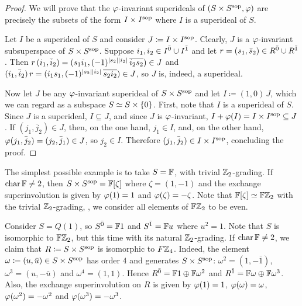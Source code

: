 \begin{proof}
    We will prove that the $\varphi$-invariant superideals of $(S \times S^{\mathrm{sop}}, \varphi)$ are precisely the subsets of the form $I \times I^{\mathrm{sop}}$ where $I$ is a superideal of $S$. 
    
    Let $I$ be a superideal of $S$ and consider $J \coloneqq I \times I^{\mathrm{sop}}$. 
    Clearly, $J$ is a $\varphi$-invariant subsuperspace of $S \times S^{\mathrm{sop}}$. 
    Suppose $i_1, i_2 \in I^{\bar0} \cup I^{\bar1}$ and let $r = (s_1, \bar s_2) \in R^{\bar0} \cup R^{\bar1}$. 
    Then $r\, (i_1, \bar i_2) = (s_1 i_1, (-1)^{|s_2||i_2|}\, \overline{i_2 s_2}) \in J$ and $(i_1, \bar i_2)\, r = (i_1 s_1, (-1)^{|s_2||i_2|}\, \overline{s_2 i_2}) \in J$, so $J$ is, indeed, a superideal.
    
    Now let $J$ be any $\varphi$-invariant superideal of $S\times S^{\mathrm{sop}}$ and let $I \coloneqq (1,0)\, J$, which we can regard as a subspace $S \simeq S \times \{ 0 \}$. 
    First, note that $I$ is a superideal of $S$.
    Since $J$ is a superideal, $I \subseteq J$, and since $J$ is $\varphi$-invariant, $I + \varphi(I) = I \times I^{\mathrm{sop}} \subseteq J$.
    If $(j_1, \bar j_2) \in J$, then, on the one hand, $j_1 \in I$, and, on the other hand, $\varphi(j_1, \bar j_2) = (j_2, \bar j_1) \in J$, so $j_2 \in I$. 
    Therefore $(j_1, \bar j_2)\in I \times I^{\mathrm{sop}}$, concluding the proof.
\end{proof}

\begin{ex}\label{ex:FxF-iso-FZ2}
    The simplest possible example is to take $S = \mathbb{F}$, with trivial $\mathbb{Z}_2$-grading. 
    If $\operatorname{char} \mathbb{F} \neq 2$, then $S\times S^{\mathrm{sop}} = \mathbb{F} [\zeta]$ where $\zeta = (1, -1)$ and the exchange superinvolution is given by $\varphi(1) = 1$ and $\varphi(\zeta) = -\zeta$.
    Note that $\mathbb{F} [\zeta] \simeq \mathbb{F}\mathbb{Z}_2$ with the trivial $\mathbb{Z}_2$-grading, \ie, we consider all elements of $\mathbb{F}\mathbb{Z}_2$ to be even.
\end{ex}

\begin{ex}\label{ex:FZ2xFZ2sop-iso-FZ4}
    Consider $S = Q(1)$, so $S^{\bar0} = \mathbb{F} 1$ and $S^{\bar1} = \mathbb{F} u$ where $u^2 =1$. 
    Note that $S$ is isomorphic to $\mathbb{F}\mathbb{Z}_2$, but this time with its natural $\mathbb{Z}_2$-grading.
    If $\operatorname{char} \mathbb{F} \neq 2$, we claim that $R \coloneqq S\times S^{\mathrm{sop}}$ is isomorphic to $F\mathbb{Z}_4$. 
    Indeed, the element $\omega \coloneqq (u, \bar u) \in S\times S^{\mathrm{sop}}$ has order $4$ and generates $S\times S^{\mathrm{sop}}$: $\omega^2 = (1, - \bar 1)$, $\omega^3 = (u, - \bar u)$ and $\omega^4 = (1, 1)$. 
    Hence $R^{\bar0} = \mathbb{F}1 \oplus \mathbb{F} \omega^2$ and $R^{\bar1} = \mathbb{F} \omega \oplus \mathbb{F} \omega^3$.
    Also, the exchange superinvolution on $R$ is given by $\varphi(1) = 1$, $\varphi(\omega) = \omega$, $\varphi(\omega^2) = -\omega^2$ and $\varphi(\omega^3) = -\omega^3$.
\end{ex}


